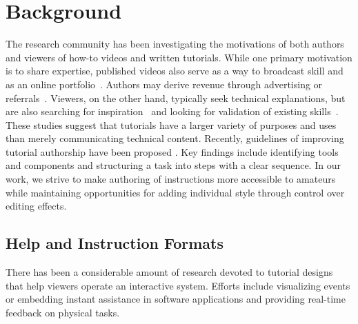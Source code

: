 

\chapter {Background}
The research community has been investigating the motivations of both authors and viewers of how-to videos and written tutorials. While one primary motivation is to share expertise, published videos also serve as a way to broadcast skill and as an online portfolio~\cite{Torrey:2007he,Kuznetsov:2010:REA:1868914.1868950}. Authors may derive revenue through advertising or referrals~\cite{Lafreniere:2012tl}. Viewers, on the other hand, typically seek technical explanations, but are also searching for inspiration~\cite{Torrey:2009fc} and looking for validation of existing skills~\cite{Lafreniere:2012tl}.
%
These studies suggest that tutorials have a larger variety of purposes and uses than merely communicating technical content. Recently, guidelines of improving tutorial authorship have been proposed \cite{Wakkary:2015:TAH:2702123.2702550}. Key findings include identifying tools and components and structuring a task into steps with a clear sequence. In our work, we strive to make authoring of instructions more accessible to amateurs while maintaining opportunities for adding individual style through control over editing effects.


\section{Help and Instruction Formats}
There has been a considerable amount of research devoted to tutorial designs that help viewers operate an interactive system. Efforts include visualizing events or embedding instant assistance in software applications and providing real-time feedback on physical tasks.


